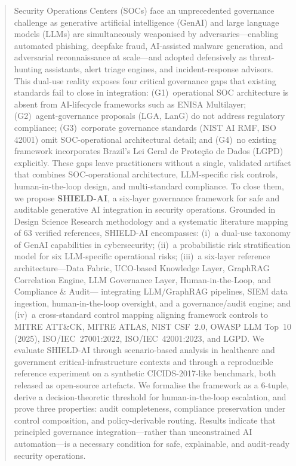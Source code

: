 \documentclass[preprint,12pt,authoryear]{elsarticle}
\begin{document}
\begin{frontmatter}
\begin{abstract}
Security Operations Centers (SOCs) face an unprecedented governance challenge as generative
artificial intelligence (GenAI) and large language models (LLMs) are simultaneously weaponised
by adversaries---enabling automated phishing, deepfake fraud, AI-assisted malware generation,
and adversarial reconnaissance at scale---and adopted defensively as threat-hunting assistants,
alert triage engines, and incident-response advisors.
This dual-use reality exposes four critical governance gaps that existing standards fail to close
in integration:
(G1)~operational SOC architecture is absent from AI-lifecycle frameworks such as ENISA Multilayer;
(G2)~agent-governance proposals (LGA, LanG) do not address regulatory compliance;
(G3)~corporate governance standards (NIST AI RMF, ISO 42001) omit SOC-operational architectural
detail; and
(G4)~no existing framework incorporates Brazil's Lei Geral de Proteção de Dados (LGPD) explicitly.
These gaps leave practitioners without a single, validated artifact that combines SOC-operational
architecture, LLM-specific risk controls, human-in-the-loop design, and multi-standard compliance.
To close them, we propose \textbf{SHIELD-AI}, a six-layer governance framework for safe and
auditable generative AI integration in security operations.
Grounded in Design Science Research methodology and a systematic literature mapping of 63 verified
references, SHIELD-AI encompasses:
(i)~a dual-use taxonomy of GenAI capabilities in cybersecurity;
(ii)~a probabilistic risk stratification model for six LLM-specific operational risks;
(iii)~a six-layer reference architecture---Data Fabric, UCO-based Knowledge Layer,
GraphRAG Correlation Engine, LLM Governance Layer, Human-in-the-Loop, and Compliance \& Audit---
integrating LLM/GraphRAG pipelines, SIEM data ingestion, human-in-the-loop oversight,
and a governance/audit engine;
and (iv)~a cross-standard control mapping aligning framework controls to MITRE ATT\&CK,
MITRE ATLAS, NIST CSF~2.0, OWASP LLM Top~10 (2025), ISO/IEC~27001:2022, ISO/IEC~42001:2023,
and LGPD.
We evaluate SHIELD-AI through scenario-based analysis in healthcare and government
critical-infrastructure contexts and through a reproducible reference experiment on a synthetic
CICIDS-2017-like benchmark, both released as open-source artefacts.
We formalise the framework as a 6-tuple, derive a decision-theoretic threshold for
human-in-the-loop escalation, and prove three properties: audit completeness, compliance
preservation under control composition, and policy-derivable routing.
Results indicate that principled governance integration---rather than unconstrained AI
automation---is a necessary condition for safe, explainable, and audit-ready security operations.
\end{abstract}


\end{frontmatter}
\end{document}
